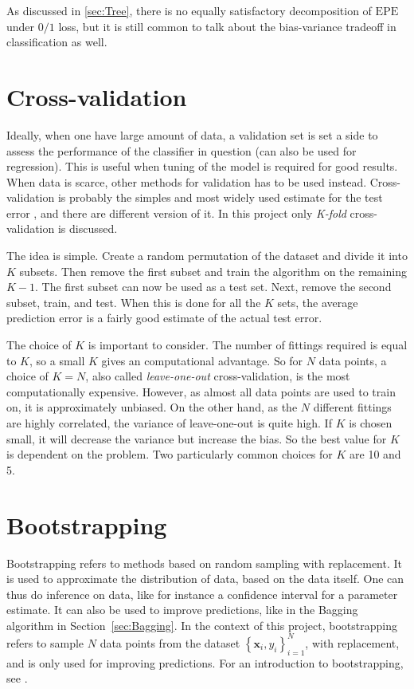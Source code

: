 As discussed in \ref{sec:Tree}, there is no equally satisfactory decomposition of $\mathrm{EPE}$ under $0/1$ loss, but it is still common to talk about the bias-variance tradeoff in classification as well.



\section{Cross-validation}
\label{sec:Cross-validation}
Ideally, when one have large amount of data, a validation set is set a side to assess the performance of the classifier in question (can also be used for regression). This is useful when tuning of the model is required for good results. When data is scarce, other methods for validation has to be used instead. Cross-validation is probably the simples and most widely used estimate for the test error \citep{modstat}, and there are different version of it. In this project only \textit{K-fold} cross-validation is discussed. 

The idea is simple. Create a random permutation of the dataset and divide it into $K$ subsets. Then remove the first subset and train the algorithm on the remaining $K-1$. The first subset can now be used as a test set. Next, remove the second subset, train, and test. When this is done for all the $K$ sets, the average prediction error is a fairly good estimate of the actual test error. 

The choice of $K$ is important to consider. The number of fittings required is equal to $K$, so a small $K$ gives an computational advantage. So for $N$ data points, a choice of $K = N$, also called \textit{leave-one-out} cross-validation, is the most computationally expensive. However, as almost all data points are used to train on, it is approximately unbiased. On the other hand, as the $N$ different fittings are highly correlated, the variance of leave-one-out is quite high. If $K$ is chosen small, it will decrease the variance but increase the bias. So the best value for $K$ is dependent on the problem. Two particularly common choices for $K$ are 10 and 5.


\section{Bootstrapping}
\label{sec:Bootstrapping}
Bootstrapping refers to methods based on random sampling with replacement. It is used to approximate the distribution of data, based on the data itself. One can thus do inference on data, like for instance a confidence interval for a parameter estimate. It can also be used to improve predictions, like in the Bagging algorithm in Section~\ref{sec:Bagging}. In the context of this project, bootstrapping refers to sample $N$ data points from the dataset $\left\{ \mathbf{x}_i, y_i \right\}_{i = 1}^N$, with replacement, and is only used for improving predictions. 
For an introduction to bootstrapping, see \cite{efron1994bootstrap}.


